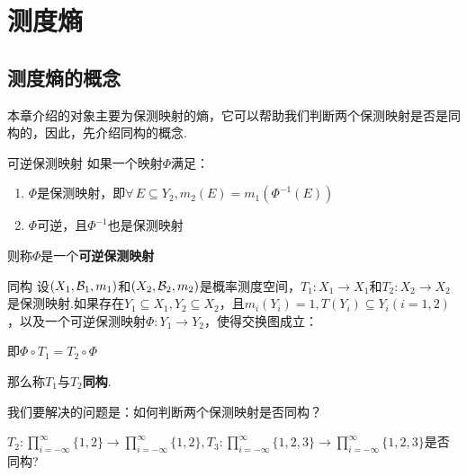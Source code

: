 \chapter{测度熵}


\section{测度熵的概念}


本章介绍的对象主要为保测映射的熵，它可以帮助我们判断两个保测映射是否是同构的，因此，先介绍同构的概念.

\begin{definition}{可逆保测映射}
    如果一个映射$\Phi$满足：
    \begin{enumerate}[(1)]
        \item $\Phi$是保测映射，即$\forall\, E\subseteq Y_2,m_2(E)=m_1\left(\Phi^{-1}(E)\right)$
        \item $\Phi$可逆，且$\Phi^{-1}$也是保测映射
    \end{enumerate}
    则称$\Phi$是一个\textbf{可逆保测映射}
\end{definition}

\begin{definition}{同构}
    设$(X_1,\mathcal{B}_1,m_1)$和$(X_2,\mathcal{B}_2,m_2)$是概率测度空间，$T_1:X_1\to X_1$和$T_2:X_2\to X_2$是保测映射.如果存在$Y_1\subseteq X_1,Y_2\subseteq X_2$，且$m_i(Y_i)=1,T(Y_i)\subseteq Y_i(i=1,2)$，以及一个可逆保测映射$\Phi:Y_1\to Y_2$，使得交换图成立： \par
\quad 即$\Phi\circ T_1=T_2\circ \Phi$\par
那么称$T_1$与$T_2$\textbf{同构}.
\end{definition}

\begin{question}
    我们要解决的问题是：如何判断两个保测映射是否同构？\par
\end{question}

\begin{instance}
    $T_2:\prod_{i=-\infty}^\infty\{1,2\}\to\prod_{i=-\infty}^\infty\{1,2\},T_3:\prod_{i=-\infty}^\infty\{1,2,3\}\to\prod_{i=-\infty}^\infty\{1,2,3\}$是否同构?
\end{instance}

